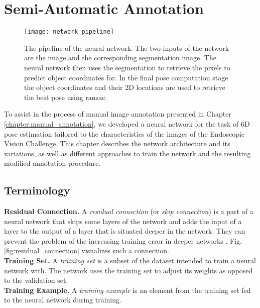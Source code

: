 \chapter{Semi-Automatic Annotation} \label{chapter:semi_automatic}

\begin{figure}[!tbp]
	\centering
    \texttt{[image: network\_pipeline]}
    \caption{The pipeline of the neural network. The two inputs of the network are the image and the corresponding segmentation image. The neural network then uses the segmentation to retrieve the pixels to predict object coordinates for. In the final pose computation stage the object coordinates and their 2D locations are used to retrieve the best pose using \ac{ransac}.}
    	\label{fig:network_pipeline}
\end{figure} 

To assist in the process of manual image annotation presented in Chapter \ref{chapter:manual_annotation}, we developed a neural network for the task of 6D pose estimation tailored to the characteristics of the images of the Endoscopic Vision Challenge. This chapter describes the network architecture and its variations, as well as different approaches to train the network and the resulting modified annotation procedure.

\section{Terminology} \label{section:network_terminology}

\noindent\textbf{Residual Connection.} A \textit{residual connection} (or \textit{skip connection}) is a part of a neural network that skips some layers of the network and adds the input of a layer to the output of a layer that is situated deeper in the network. They can prevent the problem of the increasing training error in deeper networks \cite{resnet}. Fig. \ref{fig:residual_connection} visualizes such a connection. \\

\noindent\textbf{Training Set.} A \textit{training set} is a subset of the dataset intended to train a neural network with. The network uses the training set to adjust its weights as opposed to the validation set. \\

\noindent\textbf{Training Example.} A \textit{training example} is an element from the training set fed to the neural network during training. \\

